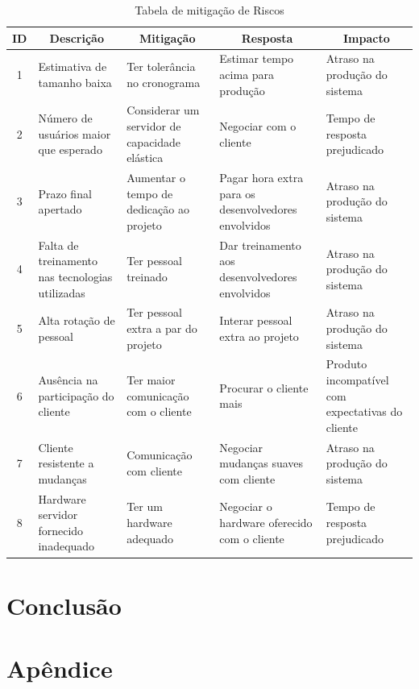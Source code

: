 \documentclass[a4paper,11pt]{article}
\begin{document}
	\begin{table}[H]
		\begin{tabular}{c|p{}|p{}|p{}|p{}}
			\textbf{ID} & \multicolumn{1}{c|}{\textbf{Descrição}} & \multicolumn{1}{c|}{\textbf{Mitigação}} & \multicolumn{1}{c|}{\textbf{Resposta}} & \multicolumn{1}{c}{\textbf{Impacto}} \\
			\hline
			1 & Estimativa de tamanho baixa & Ter tolerância no cronograma & Estimar tempo acima para produção & Atraso na produção do sistema \\ \hline
			2 & Número de usuários maior que esperado & Considerar um servidor de capacidade elástica & Negociar com o cliente & Tempo de resposta prejudicado \\ \hline
			3 & Prazo final apertado & Aumentar o tempo de dedicação ao projeto & Pagar hora extra para os desenvolvedores envolvidos & Atraso na produção do sistema \\ \hline
			4 & Falta de treinamento nas tecnologias utilizadas & Ter pessoal treinado & Dar treinamento aos desenvolvedores envolvidos & Atraso na produção do sistema \\ \hline
			5 & Alta rotação de pessoal & Ter pessoal extra a par do projeto & Interar pessoal extra ao projeto & Atraso na produção do sistema \\ \hline
			6 & Ausência na participação do cliente & Ter maior comunicação com o cliente & Procurar o cliente mais & Produto incompatível com expectativas do cliente \\ \hline
			7 & Cliente resistente a mudanças & Comunicação com cliente & Negociar mudanças suaves com cliente & Atraso na produção do sistema \\ \hline
			8 & Hardware servidor fornecido inadequado & Ter um hardware adequado & Negociar o hardware oferecido com o cliente & Tempo de resposta prejudicado \\
		\end{tabular}
		\caption{Tabela de mitigação de Riscos}
	\end{table}


\section{Conclusão}

\section{Apêndice}\label{apendice}
\end{document}
